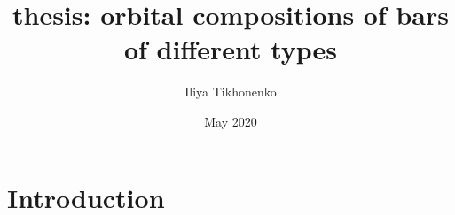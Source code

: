 \documentclass{article}
\title{thesis: orbital compositions of bars of different types}
\author{Iliya Tikhonenko}
\date{May 2020}
\begin{document}
\maketitle

\section{Introduction}
\end{document}
